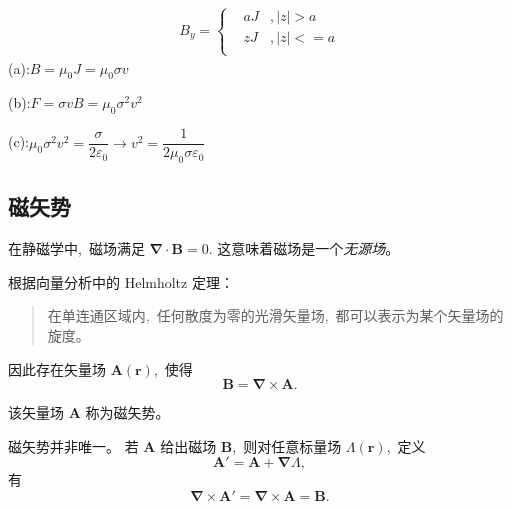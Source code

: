 \begin{align*}
    B_y=\left\{\begin{aligned}
        &aJ&,|z|>a\\
        &zJ&,|z|<=a\\
    \end{aligned}\right.
\end{align*}
(a):$
    B=\mu_0J=\mu_0\sigma v$

(b):$F=\sigma vB=\mu_0\sigma^2 v^2$

(c):$\mu_0\sigma^2 v^2=\dfrac{\sigma}{2\varepsilon_0}\to v^2=\dfrac{1}{2\mu_0\sigma \varepsilon_0}$
\subsection{磁矢势}


在静磁学中, \,磁场满足
$
\boldsymbol{\nabla}\cdot\boldsymbol{B}=0.
$
这意味着磁场是一个\emph{无源场}。

根据向量分析中的 Helmholtz 定理：

\begin{quote}
在单连通区域内, \,任何散度为零的光滑矢量场, \,都可以表示为某个矢量场的旋度。
\end{quote}

因此存在矢量场
$\boldsymbol{A}(\boldsymbol{r})$, \,使得
\begin{equation}
\boxed{
\boldsymbol{B}=\boldsymbol{\nabla}\times\boldsymbol{A}.
}
\end{equation}

该矢量场 $\boldsymbol{A}$ 称为{磁矢势}。



磁矢势并非唯一。
若 $\boldsymbol{A}$ 给出磁场 $\boldsymbol{B}$, \,则对任意标量场
$\Lambda(\boldsymbol{r})$, \,定义
\begin{equation}
\boldsymbol{A}'=\boldsymbol{A}+\boldsymbol{\nabla}\Lambda,
\end{equation}
有
\begin{equation}
\boldsymbol{\nabla}\times\boldsymbol{A}'
=
\boldsymbol{\nabla}\times\boldsymbol{A}
=
\boldsymbol{B}.
\end{equation}

